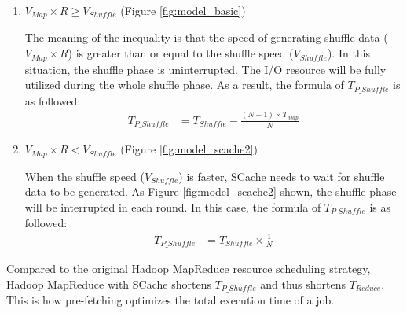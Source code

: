 {\begin{enumerate}
    \item \(V_{Map} \times R \ge V_{Shuffle}\) (Figure \ref{fig:model_basic})
	 
	The meaning of the inequality is that the speed of generating shuffle data (\(V_{Map} \times R\)) is greater than or equal to the shuffle speed (\(V_{Shuffle}\)). 
	In this situation, the shuffle phase is uninterrupted. The I/O resource will be fully utilized during the whole shuffle phase. As a result, the formula of \(T_{P\_Shuffle}\) is as followed:
	\begin{equation}
		\label{equation_Tpshuffle1}
		\begin{aligned}
			T_{P\_Shuffle} &= T_{Shuffle} - \frac{(N - 1)\times T_{Map}}{N}
		\end{aligned}
	\end{equation}
	
    \item \(V_{Map} \times R < V_{Shuffle}\) (Figure \ref{fig:model_scache2})
 
	When the shuffle speed (\(V_{Shuffle}\)) is faster, SCache needs to wait for shuffle data to be generated. As Figure \ref{fig:model_scache2} shown, the shuffle phase will be interrupted in each round. In this case, the formula of \(T_{P\_Shuffle}\) is as followed:
	\begin{equation}
		\label{equation_Tpshuffle2}
		\begin{aligned}
			T_{P\_Shuffle} &= T_{Shuffle} \times \frac{1}{N}
		\end{aligned}
	\end{equation}
\end{enumerate}

Compared to the original Hadoop MapReduce resource scheduling strategy, Hadoop MapReduce with SCache shortens \(T_{P\_Shuffle}\) and thus shortens \(T_{Reduce}\). This is how pre-fetching optimizes the total execution time of a job.

\begin{table}
\centering
{}
\end{table}}
